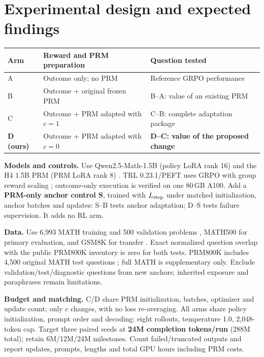 \documentclass{article}
\begin{document}
\section{Experimental design and expected findings}
\begin{center}
\small
\renewcommand{\arraystretch}{1.12}
\begin{tabularx}{\linewidth}{@{}l L L@{}}
\toprule
\textbf{Arm} & \textbf{Reward and PRM preparation} & \textbf{Question tested} \\
\midrule
A & Outcome only; no PRM & Reference GRPO performance \\
B & Outcome + original frozen PRM & B--A: value of an existing PRM \\
C & Outcome + PRM adapted with $c=1$ & C--B: complete adaptation package \\
\textbf{D (ours)} & Outcome + PRM adapted with $c=0$ & \textbf{D--C: value of the proposed change} \\
\bottomrule
\end{tabularx}
\end{center}
\textbf{Models and controls.} Use Qwen2.5-Math-1.5B (policy LoRA rank 16) and the H4 1.5B PRM (PRM LoRA rank 8) \citep{h4prm}. TRL 0.23.1/PEFT uses GRPO with group reward scaling \citep{trl}; outcome-only execution is verified on one 80\,GB A100. Add a \textbf{PRM-only anchor control S}, trained with $L_{\rm step}$ under matched initialization, anchor batches and updates: S--B tests anchor adaptation; D--S tests failure supervision. It adds no RL arm.

\textbf{Data.} Use 6,993 MATH training and 500 validation problems \citep{hendrycks2021}, MATH500 for primary evaluation, and GSM8K for transfer \citep{cobbe2021}. Exact normalized question overlap with the public PRM800K inventory is zero for both tests. PRM800K includes 4,500 original MATH test questions \citep{prmdata}; full MATH is supplementary only. Exclude validation/test/diagnostic questions from new anchors; inherited exposure and paraphrases remain limitations.

\textbf{Budget and matching.} C/D share PRM initialization, batches, optimizer and update count; only $c$ changes, with no loss re-averaging. All arms share policy initialization, prompt order and decoding: eight rollouts, temperature 1.0, 2,048-token cap. Target three paired seeds at \textbf{24M completion tokens/run} (288M total); retain 6M/12M/24M milestones. Count failed/truncated outputs and report updates, prompts, lengths and total GPU hours including PRM costs.
\end{document}
